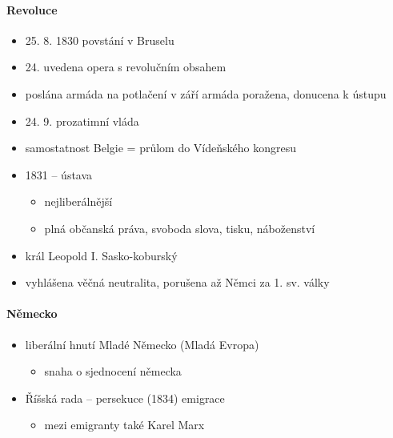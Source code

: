 \paragraph{Revoluce}
\begin{itemize}
\item 25. 8. 1830 povstání v Bruselu
	\item 24. uvedena opera s revolučním obsahem
\item poslána armáda na potlačení \ra v září armáda poražena, donucena k ústupu
\item 24. 9. prozatimní vláda
\item samostatnost Belgie = průlom do Vídeňského kongresu
\item 1831 -- ústava
	\begin{itemize}
	\item nejliberálnější 
	\item plná občanská práva, svoboda slova, tisku, náboženství
	\end{itemize}
\item král Leopold I. Sasko-koburský
\item vyhlášena věčná neutralita, porušena až Němci za 1. sv. války
\end{itemize}

\paragraph{Německo}
\begin{itemize}
\item liberální hnutí Mladé Německo (Mladá Evropa)
	\begin{itemize}
	\item snaha o sjednocení německa
	\end{itemize}
\item[\ra] Říšská rada -- persekuce (1834) \ra emigrace
	\begin{itemize}
	\item mezi emigranty také Karel Marx
	\end{itemize}
\end{itemize}


